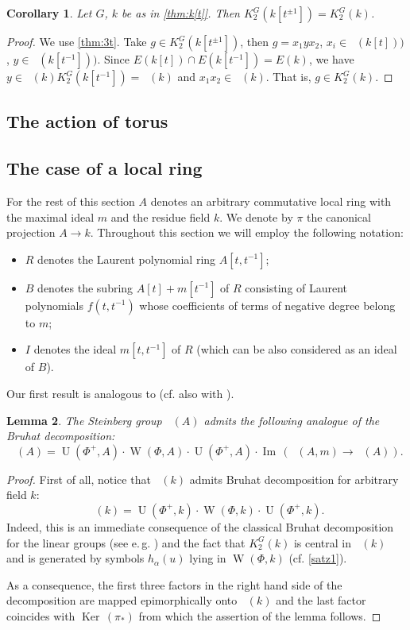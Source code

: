 \documentclass[oneside,12pt]{amsart}
\numberwithin{equation}{section}
\newtheorem{lem}{Lemma}
\numberwithin{lem}{section}
\newtheorem{cor}[lem]{Corollary}
\theoremstyle{definition}
\theoremstyle{remark}
\DeclareMathOperator{\UU}{U}
\DeclareMathOperator{\St}{St^G}
\DeclareMathOperator{\WW}{W}
\DeclareMathOperator{\Bigker}{Ker\,}
\DeclareMathOperator{\im}{Im\,}
\begin{document}
\begin{cor} Let $G$, $k$ be as in \cref{thm:k[t]}. Then $K_2^G(k[t^{\pm 1}])=K_2^G(k)$. \end{cor}
\begin{proof} We use \cref{thm:3t}.
 Take $g\in K_2^G(k[t^{\pm 1}])$,
 then $g=x_1yx_2$, $x_i\in \St(k[t]))$, $y\in \St(k[t^{-1}]))$.
 Since $E(k[t])\cap E(k[t^{-1}])=E(k)$,
 we have $y\in\St(k)K_2^G(k[t^{-1}])=\St(k)$ and $x_1x_2\in\St(k)$. That is, $g\in K_2^G(k)$. \end{proof}

\subsection{The action of torus}  
 
\subsection{The case of a local ring}
For the rest of this section $A$ denotes an arbitrary commutative local ring with the maximal ideal $m$ and the residue field $k$.
We denote by $\pi$ the canonical projection $A \rightarrow k$.
Throughout this section we will employ the following notation:
\begin{itemize}
 \item $R$ denotes the Laurent polynomial ring $A[t, t^{-1}]$;
 \item $B$ denotes the subring $A[t] + m[t^{-1}]$ of $R$ consisting of Laurent polynomials $f(t,t^{-1})$ whose coefficients of terms of negative degree belong to $m$;
 \item $I$ denotes the ideal $m[t, t^{-1}]$ of $R$ (which can be also considered as an ideal of $B$). \end{itemize}

Our first result is analogous to \cite[Lemma~3.1(e)]{Tu} (cf. also with \cite[\S~2.3A]{HOM}).
\begin{lem} \label{cor:bruhat} The Steinberg group $\St(A)$ admits the following analogue of the Bruhat decomposition:
\[ \St(A) = \UU(\Phi^+, A) \cdot \WW(\Phi, A) \cdot \UU(\Phi^+, A) \cdot \im(\St(A, m) \rightarrow \St(A)).\] \end{lem}
\begin{proof} First of all, notice that $\St(k)$ admits Bruhat decomposition for arbitrary field $k$:
 $$\St(k) = \UU(\Phi^+, k) \cdot \WW(\Phi, k) \cdot \UU(\Phi^+, k).$$
 Indeed, this is an immediate consequence of the classical Bruhat decomposition for the linear groups (see e.\,g. \cite[Theorem~4]{St-lect}) and the fact
 that $K_2^G(k)$ is central in $\St(k)$ and is generated by symbols $h_\alpha(u)$ lying in $\WW(\Phi, k)$ (cf. \cref{satz1}). 
 
 As a consequence, the first three factors in the right hand side of the decomposition are mapped epimorphically onto $\St(k)$ and the last factor coincides with $\Bigker(\pi_*)$
 from which the assertion of the lemma follows. \end{proof}
\end{document}
